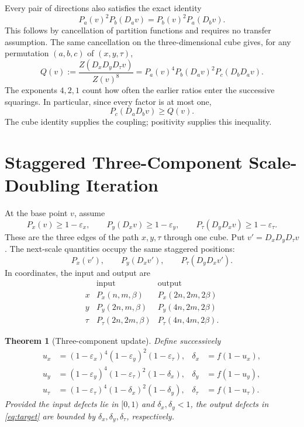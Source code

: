 \documentclass[11pt]{article}
\newcommand{\ee}{\varepsilon}
\newtheorem{theorem}{Theorem}
\begin{document}
Every pair of directions also satisfies the exact identity
\begin{equation}
	P_a(v)^2P_b(D_av)=P_b(v)^2P_a(D_bv).
	\label{eq:face}
\end{equation}
This follows by cancellation of partition functions and requires no
transfer assumption. The same cancellation on the three-dimensional
cube gives, for any permutation \((a,b,c)\) of \((x,y,\tau)\),
\begin{equation}
	Q(v):=\frac{Z(D_xD_yD_\tau v)}{Z(v)^8}
	=P_a(v)^4P_b(D_av)^2P_c(D_bD_av).
	\label{eq:cube}
\end{equation}
The exponents \(4,2,1\) count how often the earlier ratios enter the
successive squarings. In particular, since every factor is at most one,
\begin{equation}
	P_c(D_aD_bv)\ge Q(v).
	\label{eq:last-edge}
\end{equation}
The cube identity supplies the coupling; positivity supplies this
inequality.

\section{Staggered Three-Component Scale-Doubling Iteration}

At the base point \(v\), assume
\begin{equation}
	P_x(v)\ge1-\ee_x,\qquad
	P_y(D_xv)\ge1-\ee_y,\qquad
	P_\tau(D_yD_xv)\ge1-\ee_\tau.
	\label{eq:seed}
\end{equation}
These are the three edges of the path \(x,y,\tau\) through one cube.
Put \(v'=D_xD_yD_\tau v\). The next-scale quantities occupy the same
staggered positions:
\begin{equation}
	P_x(v'),\qquad P_y(D_xv'),\qquad P_\tau(D_yD_xv').
	\label{eq:target}
\end{equation}
In coordinates, the input and output are
\[
	\begin{array}{c|c|c}
		     & \text{input}        & \text{output}         \\ \hline
		x    & P_x(n,m,\beta)      & P_x(2n,2m,2\beta)     \\
		y    & P_y(2n,m,\beta)     & P_y(4n,2m,2\beta)     \\
		\tau & P_\tau(2n,2m,\beta) & P_\tau(4n,4m,2\beta).
	\end{array}
\]

\begin{theorem}[Three-component update]
	Define successively
	\begin{align}
		u_x         & =(1-\ee_x)^4(1-\ee_y)^2(1-\ee_\tau),         &
		\delta_x    & =f(1-u_x),\label{eq:update-x}                  \\
		u_y         & =(1-\ee_y)^4(1-\ee_\tau)^2(1-\delta_x),      &
		\delta_y    & =f(1-u_y),\label{eq:update-y}                  \\
		u_\tau      & =(1-\ee_\tau)^4(1-\delta_x)^2(1-\delta_y),   &
		\delta_\tau & =f(1-u_\tau).\label{eq:update-t}
	\end{align}
	Provided the input defects lie in \([0,1)\) and
	\(\delta_x,\delta_y<1\), the output defects in
	\eqref{eq:target} are bounded by \(\delta_x,\delta_y,\delta_\tau\),
	respectively.
\end{theorem}
\end{document}
